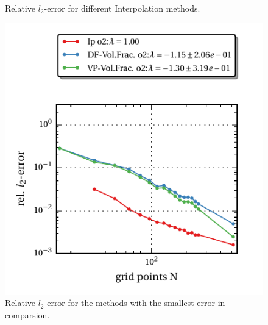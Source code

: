 \begin{figure}[!bp]
\begin{minipage}[c]{0.5\textwidth}
      \caption{Relative $l_2$-error for different Interpolation methods.}
  \end{minipage}
  \begin{minipage}[c]{0.5\textwidth}
      \includegraphics{gfx/immersed_boundary/tcflow/theo/all.pdf}
      \caption{Relative $l_2$-error for the methods with the smallest error in comparsion.}
  \end{minipage}
\end{figure}
\clearpage


